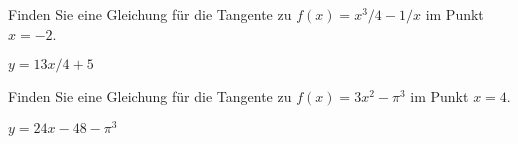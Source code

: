 \begin{exercises}
\begin{exercise}
  Finden Sie eine Gleichung für die Tangente zu $f(x) = x^3/4 - 1/x$ im Punkt $x=-2$.
\begin{answer} $y=13x/4+5$
\end{answer}\end{exercise}

\begin{exercise} 
  Finden Sie eine Gleichung für die Tangente zu $f(x)= 3x^2 - \pi ^3$ im Punkt
  $x= 4$.
\begin{answer} $y=24x-48-\pi^3$
\end{answer}
\end{exercise}

\end{exercises}
